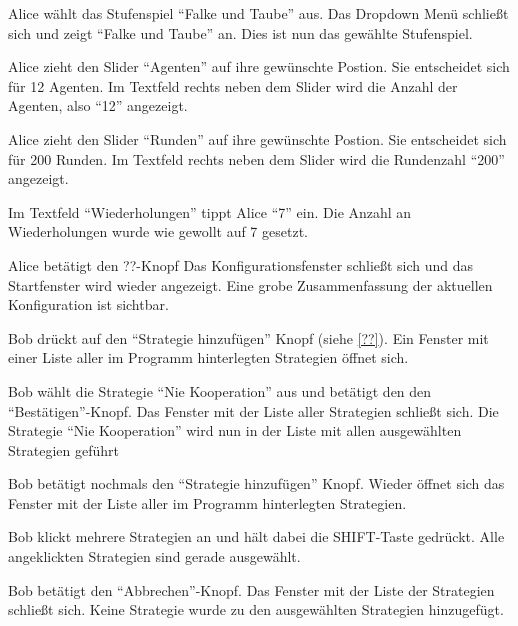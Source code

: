 \documentclass[parskip=full,11pt]{scrartcl}
\begin{document}
\teststep{}
{Alice wählt das Stufenspiel \enquote{Falke und Taube} aus.}
{Das Dropdown Menü schließt sich und zeigt \enquote{Falke und Taube} an. Dies ist nun das gewählte Stufenspiel.}

{Alice zieht den Slider \enquote{Agenten} auf ihre gewünschte Postion. Sie entscheidet sich für 12 Agenten.}%
{Im Textfeld rechts neben dem Slider wird die Anzahl der Agenten, also \enquote{12} angezeigt.}

{Alice zieht den Slider \enquote{Runden} auf ihre gewünschte Postion. Sie entscheidet sich für 200 Runden.}%
{Im Textfeld rechts neben dem Slider wird die Rundenzahl \enquote{200} angezeigt.}

{Im Textfeld \enquote{Wiederholungen} tippt Alice \enquote{7} ein.}%
{Die Anzahl an Wiederholungen wurde wie gewollt auf 7 gesetzt.}

{Alice betätigt den ??-Knopf}
{Das Konfigurationsfenster schließt sich und das Startfenster wird wieder angezeigt. Eine grobe Zusammenfassung der aktuellen Konfiguration ist sichtbar.}


%
{Bob drückt auf den \enquote{Strategie hinzufügen} Knopf (siehe \cref{??}).}
{Ein Fenster mit einer Liste aller im Programm hinterlegten Strategien öffnet sich.}

\teststep{}
{Bob wählt die Strategie \enquote{Nie Kooperation} aus und betätigt den den \enquote{Bestätigen}-Knopf.}
{Das Fenster mit der Liste aller Strategien schließt sich. Die Strategie \enquote{Nie Kooperation} wird nun in der Liste mit allen ausgewählten Strategien geführt}

{Bob betätigt nochmals den  \enquote{Strategie hinzufügen} Knopf.}
{Wieder öffnet sich das Fenster mit der Liste aller im Programm hinterlegten Strategien.}

\teststep{}
{Bob klickt mehrere Strategien an und hält dabei die SHIFT-Taste gedrückt.}
{Alle angeklickten Strategien sind gerade ausgewählt.}

\teststep{}
{Bob betätigt den \enquote{Abbrechen}-Knopf.}
{Das Fenster mit der Liste der Strategien schließt sich. Keine Strategie wurde zu den ausgewählten Strategien hinzugefügt.}
\end{document}
